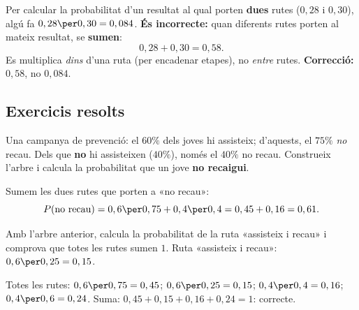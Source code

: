 \begin{exemple}
Per calcular la probabilitat d'un resultat al qual porten \textbf{dues} rutes ($0,28$ i
$0,30$), algú fa $0,28\per 0,30=0,084$. \textbf{És incorrecte:} quan diferents rutes
porten al mateix resultat, se \textbf{sumen}:
\[
0,28+0,30=0,58.
\]
Es multiplica \emph{dins} d'una ruta (per encadenar etapes), no \emph{entre} rutes.
\textbf{Correcció:} $0,58$, no $0,084$.
\end{exemple}

\subsection{Exercicis resolts}

\begin{exresolt}
Una campanya de prevenció: el $60\%$ dels joves hi assisteix; d'aquests, el $75\%$
\emph{no} recau. Dels que \textbf{no} hi assisteixen ($40\%$), només el $40\%$ no recau.
Construeix l'arbre i calcula la probabilitat que un jove \textbf{no recaigui}.
\solucio
\begin{center}
\end{center}
Sumem les dues rutes que porten a «no recau»:
\[
P(\text{no recau})=0,6\per 0,75+0,4\per 0,4=0,45+0,16=0,61.
\]
\end{exresolt}

\begin{exresolt}
Amb l'arbre anterior, calcula la probabilitat de la ruta «assisteix i recau» i comprova
que totes les rutes sumen $1$.
\solucio
Ruta «assisteix i recau»: $0,6\per 0,25=0,15$.

Totes les rutes: $0,6\per 0,75=0,45$; $0,6\per 0,25=0,15$; $0,4\per 0,4=0,16$;
$0,4\per 0,6=0,24$. Suma: $0,45+0,15+0,16+0,24=1$: correcte.
\end{exresolt}

